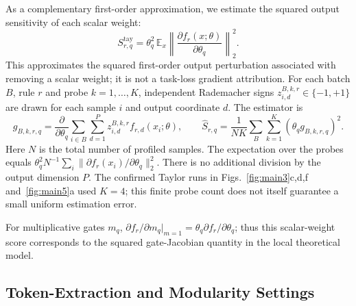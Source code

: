 \documentclass{article}
\begin{document}
As a complementary first-order approximation, we estimate the squared output sensitivity of each scalar weight:
\begin{equation}
S^{\mathrm{tay}}_{r,q}=\theta_q^2\,\mathbb{E}_x\left\|\frac{\partial f_r(x;\theta)}{\partial\theta_q}\right\|_2^2.
\end{equation}
This approximates the squared first-order output perturbation associated with removing a scalar weight; it is not a task-loss gradient attribution. For each batch $B$, rule $r$ and probe $k=1,\ldots,K$, independent Rademacher signs $z_{i,d}^{B,k,r}\in\{-1,+1\}$ are drawn for each sample $i$ and output coordinate $d$. The estimator is
\begin{equation}
g_{B,k,r,q}=\frac{\partial}{\partial\theta_q}\sum_{i\in B}\sum_{d=1}^{P}z_{i,d}^{B,k,r}f_{r,d}(x_i;\theta),\qquad
\widehat S_{r,q}=\frac{1}{NK}\sum_B\sum_{k=1}^{K}(\theta_q g_{B,k,r,q})^2.
\end{equation}
Here $N$ is the total number of profiled samples. The expectation over the probes equals $\theta_q^2N^{-1}\sum_i\|\partial f_r(x_i)/\partial\theta_q\|_2^2$. There is no additional division by the output dimension $P$. The confirmed Taylor runs in Figs.~\ref{fig:main3}c,d,f and~\ref{fig:main5}a used $K=4$; this finite probe count does not itself guarantee a small uniform estimation error.

For multiplicative gates $m_q$, $\partial f_r/\partial m_q|_{m=1}=\theta_q\partial f_r/\partial\theta_q$; thus this scalar-weight score corresponds to the squared gate-Jacobian quantity in the local theoretical model.

\subsection{Token-Extraction and Modularity Settings}
\end{document}
